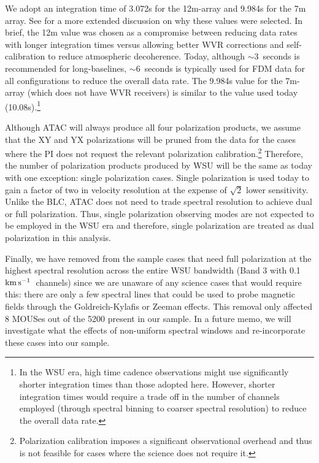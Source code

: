 \documentclass[preprint]{aastex631}
\newcommand{\kms}{\ensuremath{\rm{ km \, s^{-1}}}}
\begin{document}
We adopt an integration time of 3.072s for the 12m-array and 9.984s for the 7m array. See \citet{Carpenter2023DataRates} for a more extended discussion on why these values were selected. In brief, the 12m value was chosen as a compromise between reducing data rates with longer integration times versus allowing better WVR corrections and self-calibration to reduce atmospheric decoherence.  Today, although $\sim 3$~seconds is recommended for long-baselines, $\sim 6$~seconds is typically used for FDM data for all configurations to reduce the overall data rate. The 9.984s value for the 7m-array (which does not have WVR receivers) is similar to the value used today (10.08s).\footnote{In the WSU era, high time cadence observations might use significantly shorter integration times than those adopted here. However, shorter integration times would require a trade off in the number of channels employed (through spectral binning to coarser spectral resolution) to reduce the overall data rate.}

Although ATAC will always produce all four polarization products, we assume that the XY and YX polarizations will be pruned from the data for the cases where the PI does not request the relevant polarization calibration.\footnote{Polarization calibration imposes a significant observational overhead and thus is not feasible for cases where the science does not require it.} Therefore, the number of polarization products produced by WSU will be the same as today with one exception: single polarization cases. Single polarization is used today to gain a factor of two in velocity resolution at the expense of  $\sqrt{2}$ lower sensitivity. Unlike the BLC,  ATAC does not need to trade spectral resolution to achieve dual or full polarization. Thus, single polarization observing modes are not expected to be employed in the WSU era and therefore, single polarization are treated as dual polarization in this analysis.  

Finally, we have removed from the sample cases that need full polarization at the highest spectral resolution across the entire WSU bandwidth (Band 3 with 0.1~\kms\ channels) since we are unaware of any science cases that would require this: there are only a few spectral lines that could be used to probe magnetic fields through the Goldreich-Kylafis or Zeeman effects. This removal only affected 8 MOUSes out of the 5200 present in our sample. In a future memo, we will investigate what the effects of non-uniform spectral windows and re-incorporate these cases into our sample.
\end{document}
